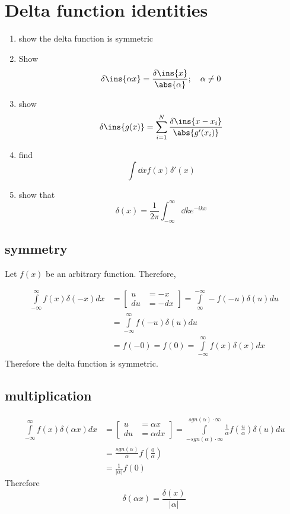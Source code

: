 \clearpage
\section{Delta function identities}
\begin{colbox}
	\begin{enumerate}
		\item show the delta function is symmetric
		\item Show \begin{equation}
			\delta\ins{\alpha x} = \frac{\delta\ins{x}}{\abs{\alpha}};\quad \alpha\neq0
		\end{equation}
		\item show \begin{equation}
			\delta\ins{g(x)} = \sum_{i=1}^{N}\frac{\delta\ins{x-x_i}}{\abs{g'(x_i)}}
		\end{equation}
		\item find \begin{equation}
			\int\dd x f(x)\delta'(x)
		\end{equation}
		\item show that \begin{equation}
			\delta(x) = \frac{1}{2\pi}\int_{-\infty}^{\infty}\dd ke^{-ikx}
		\end{equation}
	\end{enumerate}
\end{colbox}
\subsection{symmetry}
Let \(f(x)\) be an arbitrary function. Therefore,

\begin{align*}
    \int\limits_{-\infty}^\infty f(x)\delta(-x)dx &= \left[\begin{aligned}
        u&=-x\\du&=-dx
    \end{aligned}\right]=\int\limits_{\infty}^{-\infty} -f(-u)\delta(u)du\\
    &= \int\limits_{-\infty}^\infty f(-u)\delta(u)du\\
    &= f(-0) = f(0) = \int\limits_{-\infty}^\infty f(x)\delta(x)dx
\end{align*}
Therefore the delta function is symmetric.
\subsection{multiplication}
\begin{align*}
    \int\limits_{-\infty}^\infty f(x)\delta(\alpha x)dx &= \left[\begin{aligned}
        u&=\alpha x\\du&=\alpha dx
    \end{aligned}\right] = \int\limits_{-sgn(\alpha)\cdot\infty}^{sgn(\alpha)\cdot\infty} \frac{1}{\alpha}f\left(\frac{u}{\alpha}\right)\delta(u) du\\
    &= \frac{sgn(\alpha)}{\alpha}f\left(\frac{0}{\alpha}\right)\\
    &= \frac{1}{|\alpha|}f(0)
\end{align*}
Therefore
\begin{equation*}
    \delta(\alpha x)=\frac{\delta(x)}{|\alpha|}
\end{equation*}
